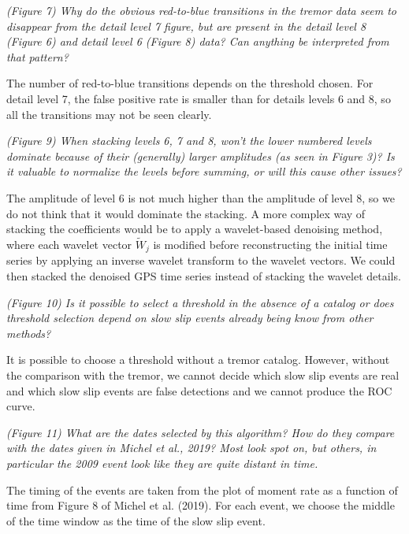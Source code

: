 \documentclass[letterpaper, 12pt]{article}
\begin{document}
\bigskip

\textit{(Figure 7) Why do the obvious red-to-blue transitions in the tremor data seem to disappear from the detail level 7 figure, but are present in the detail level 8 (Figure 6) and detail level 6 (Figure 8) data? Can anything be interpreted from that pattern?}

\bigskip

The number of red-to-blue transitions depends on the threshold chosen. For detail level 7, the false positive rate is smaller than for details levels 6 and 8, so all the transitions may not be seen clearly.

\bigskip

\textit{(Figure 9) When stacking levels 6, 7 and 8, won't the lower numbered levels dominate because of their (generally) larger amplitudes (as seen in Figure 3)? Is it valuable to normalize the levels before summing, or will this cause other issues?}

\bigskip

The amplitude of level 6 is not much higher than the amplitude of level 8, so we do not think that it would dominate the stacking. A more complex way of stacking the coefficients would be to apply a wavelet-based denoising method, where each wavelet vector $\widetilde{W}_j$ is modified before reconstructing the initial time series by applying an inverse wavelet transform to the wavelet vectors. We could then stacked the denoised GPS time series instead of stacking the wavelet details.

\bigskip

\textit{(Figure 10) Is it possible to select a threshold in the absence of a catalog or does threshold selection depend on slow slip events already being know from other methods?}

\bigskip

It is possible to choose a threshold without a tremor catalog. However, without the comparison with the tremor, we cannot decide which slow slip events are real and which slow slip events are false detections and we cannot produce the ROC curve.

\bigskip

\textit{(Figure 11) What are the dates selected by this algorithm? How do they compare with the dates given in Michel et al., 2019? Most look spot on, but others, in particular the 2009 event look like they are quite distant in time.}

\bigskip

The timing of the events are taken from the plot of moment rate as a function of time from Figure 8 of Michel et al. (2019). For each event, we choose the middle of the time window as the time of the slow slip event.
\end{document}
